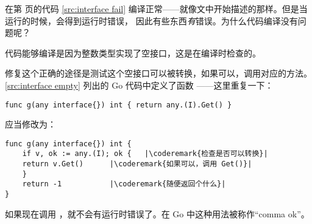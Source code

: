 \begin{Exercise}[title={接口和编译},difficulty=1]
\Question
在第 \pageref{src:interface fail} 页的代码 \ref{src:interface fail} 
编译正常——就像文中开始描述的那样。但是当运行的时候，会得到运行时错误，
因此有些东西\emph{有}错误。为什么代码编译没有问题呢？
\end{Exercise}

\begin{Answer}
\Question
代码能够编译是因为整数类型实现了空接口，这是在编译时检查的。

修复这个正确的途径是测试这个空接口可以被转换，如果可以，调用对应的方法。
\ref{src:interface empty} 列出的 Go 代码中定义了函数 ——这里重复一下：
\begin{lstlisting}
func g(any interface{}) int { return any.(I).Get() }
\end{lstlisting}

\noindent{}应当修改为：
\begin{lstlisting}
func g(any interface{}) int {
    if v, ok := any.(I); ok {	|\coderemark{检查是否可以转换}|
	return v.Get()		|\coderemark{如果可以，调用 Get()}|
    }
    return -1			|\coderemark{随便返回个什么}|
}
\end{lstlisting}
如果现在调用 ，就不会有运行时错误了。在 Go 中这种用法被称作``comma ok''。
\end{Answer}
